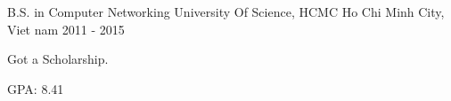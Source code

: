 

\begin{cventries}

  \cventry
    {B.S. in Computer Networking} %
    {University Of Science, HCMC} %
    {Ho Chi Minh City, Viet nam} %
    {2011 - 2015} %
    {
      \begin{cvitems} %
        \item {Got a Scholarship.}
        \item {GPA: 8.41}
      \end{cvitems}
    }

\end{cventries}

